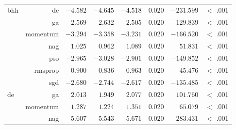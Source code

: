 \begin{table}[htbp]
{\begin{tabular}{lrrrrrrr}
                  bhh                  & de                   & $-4.582$             & $-4.645$                                        & $-4.518$             & $0.020$              & $-231.599$           & $<$ .001    \\
                  $ $                  & ga                   & $-2.569$             & $-2.632$                                        & $-2.505$             & $0.020$              & $-129.839$           & $<$ .001    \\
                                       & momentum             & $-3.294$             & $-3.358$                                        & $-3.231$             & $0.020$              & $-166.520$           & $<$ .001    \\
                                       & nag                  & $1.025$              & $0.962$                                         & $1.089$              & $0.020$              & $51.831$             & $<$ .001    \\
                                       & pso                  & $-2.965$             & $-3.028$                                        & $-2.901$             & $0.020$              & $-149.852$           & $<$ .001    \\
                                       & rmsprop              & $0.900$              & $0.836$                                         & $0.963$              & $0.020$              & $45.476$             & $<$ .001    \\
                                       & sgd                  & $-2.680$             & $-2.744$                                        & $-2.617$             & $0.020$              & $-135.485$           & $<$ .001    \\
                  de                   & ga                   & $2.013$              & $1.949$                                         & $2.077$              & $0.020$              & $101.760$            & $<$ .001    \\
                  $ $                  & momentum             & $1.287$              & $1.224$                                         & $1.351$              & $0.020$              & $65.079$             & $<$ .001    \\
                                       & nag                  & $5.607$              & $5.543$                                         & $5.671$              & $0.020$              & $283.431$            & $<$ .001    \\

\end{tabular}}
\end{table}
